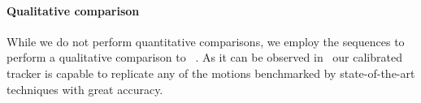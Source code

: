 \paragraph{Qualitative comparison}
While we do not perform quantitative comparisons, we employ the \handy{} sequences to perform a qualitative comparison to~\cite{sridhar2015fast,sharp2015accurate,taylor2016concerto} . As it can be observed in~ our calibrated tracker is capable to replicate any of the motions benchmarked by state-of-the-art techniques with great accuracy.





